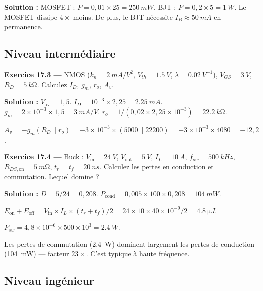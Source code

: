 \documentclass[12pt,a4paper,twoside]{book}
\begin{document}
\begin{pratique}
\textbf{Solution :} MOSFET : $P = 0{,}01\times25 = \SI{250}{mW}$. BJT : $P = 0{,}2\times5 = \SI{1}{W}$. Le MOSFET dissipe $4\times$ moins. De plus, le BJT nécessite $I_B \approx \SI{50}{mA}$ en permanence.
\end{pratique}

\subsection*{Niveau intermédiaire}

\textbf{Exercice 17.3 ---} NMOS ($k_n = \SI{2}{mA/V^2}$, $V_{th} = \SI{1.5}{V}$, $\lambda = \SI{0.02}{V^{-1}}$), $V_{GS} = \SI{3}{V}$, $R_D = \SI{5}{k\ohm}$. Calculez $I_D$, $g_m$, $r_o$, $A_v$.

\begin{pratique}
\textbf{Solution :} $V_{\text{ov}} = 1{,}5$. $I_D = 10^{-3}\times2{,}25 = \SI{2.25}{mA}$. $g_m = 2\times10^{-3}\times1{,}5 = \SI{3}{mA/V}$. $r_o = 1/(0{,}02\times2{,}25\times10^{-3}) = \SI{22.2}{k\ohm}$.

$A_v = -g_m(R_D\parallel r_o) = -3\times10^{-3}\times(5000\parallel22200) = -3\times10^{-3}\times4080 = -12{,}2$.
\end{pratique}

\textbf{Exercice 17.4 ---} Buck : $V_{\text{in}} = \SI{24}{V}$, $V_{\text{out}} = \SI{5}{V}$, $I_L = \SI{10}{A}$, $f_{sw} = \SI{500}{kHz}$, $R_{DS,\text{on}} = \SI{5}{m\ohm}$, $t_r = t_f = \SI{20}{ns}$. Calculez les pertes en conduction et commutation. Lequel domine ?

\begin{pratique}
\textbf{Solution :} $D = 5/24 = 0{,}208$. $P_{\text{cond}} = 0{,}005\times100\times0{,}208 = \SI{104}{mW}$.

$E_{\text{on}}+E_{\text{off}} = V_{\text{in}}\times I_L\times(t_r+t_f)/2 = 24\times10\times40\times10^{-9}/2 = \SI{4.8}{\micro J}$.

$P_{sw} = 4{,}8\times10^{-6}\times500\times10^3 = \SI{2.4}{W}$.

Les pertes de commutation (\SI{2.4}{W}) dominent largement les pertes de conduction (\SI{104}{mW}) --- facteur $23\times$. C'est typique à haute fréquence.
\end{pratique}

\subsection*{Niveau ingénieur}
\end{document}
